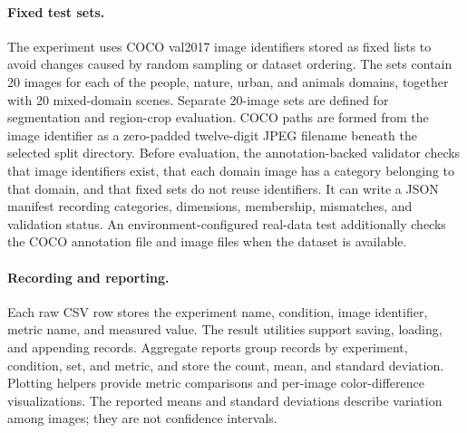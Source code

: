 \documentclass{FastFyp}
\begin{document}
\paragraph{Fixed test sets.}
The experiment uses COCO val2017 image identifiers stored as fixed lists to
avoid changes caused by random sampling or dataset ordering. The sets contain
20 images for each of the people, nature, urban, and animals domains, together
with 20 mixed-domain scenes. Separate 20-image sets are defined for
segmentation and region-crop evaluation. COCO paths are formed from the image
identifier as a zero-padded twelve-digit JPEG filename beneath the selected
split directory. Before evaluation, the annotation-backed validator checks
that image identifiers exist, that each domain image has a category belonging
to that domain, and that fixed sets do not reuse identifiers. It can write a
JSON manifest recording categories, dimensions, membership, mismatches, and
validation status. An environment-configured real-data test additionally
checks the COCO annotation file and image files when the dataset is available.

\paragraph{Recording and reporting.}
Each raw CSV row stores the experiment name, condition, image identifier,
metric name, and measured value. The result utilities support saving, loading,
and appending records. Aggregate reports group records by experiment,
condition, set, and metric, and store the count, mean, and standard deviation.
Plotting helpers provide metric comparisons and per-image color-difference
visualizations. The reported means and standard deviations describe variation
among images; they are not confidence intervals.
\end{document}
